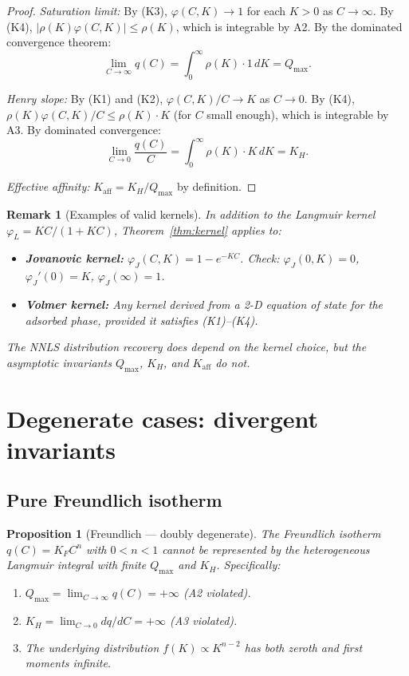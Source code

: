 \documentclass[12pt]{article}
\newtheorem{proposition}{Proposition}
\newtheorem{remark}{Remark}
\begin{document}
\begin{proof}
\textit{Saturation limit:}
By (K3), $\varphi(C,K)\to 1$ for each $K>0$ as $C\to\infty$.
By (K4), $|\rho(K)\varphi(C,K)|\le\rho(K)$, which is integrable by
A2.  By the dominated convergence theorem:
\[
  \lim_{C\to\infty}q(C) = \int_0^\infty \rho(K)\cdot 1\,dK
  = Q_{\max}.
\]

\textit{Henry slope:}
By (K1) and (K2), $\varphi(C,K)/C\to K$ as $C\to 0$.
By (K4), $\rho(K)\varphi(C,K)/C\le\rho(K)\cdot K$ (for $C$
small enough), which is integrable by A3.  By dominated convergence:
\[
  \lim_{C\to 0}\frac{q(C)}{C}
  = \int_0^\infty \rho(K)\cdot K\,dK = K_H.
\]

\textit{Effective affinity:}
$K_{\mathrm{aff}}=K_H/Q_{\max}$ by definition.
\end{proof}

\begin{remark}[Examples of valid kernels]
In addition to the Langmuir kernel $\varphi_L=KC/(1+KC)$,
Theorem~\ref{thm:kernel} applies to:
\begin{itemize}[nosep]
  \item \textbf{Jovanovic kernel:}
        $\varphi_J(C,K)=1-e^{-KC}$.
        Check: $\varphi_J(0,K)=0$, $\varphi_J'(0)=K$,
        $\varphi_J(\infty)=1$.
  \item \textbf{Volmer kernel:}
        Any kernel derived from a 2-D equation of state for the
        adsorbed phase, provided it satisfies (K1)--(K4).
\end{itemize}
The NNLS distribution recovery \emph{does} depend on the kernel
choice, but the asymptotic invariants $Q_{\max}$, $K_H$, and
$K_{\mathrm{aff}}$ do not.
\end{remark}

\section{Degenerate cases: divergent invariants}
\label{sec:degenerate}

\subsection{Pure Freundlich isotherm}

\begin{proposition}[Freundlich --- doubly degenerate]
\label{prop:freundlich}
The Freundlich isotherm $q(C)=K_F C^{n}$ with $0<n<1$ cannot be
represented by the heterogeneous Langmuir integral with finite
$Q_{\max}$ and $K_H$.  Specifically:
\begin{enumerate}[nosep]
  \item $Q_{\max}=\lim_{C\to\infty}q(C)=+\infty$
        \quad (A2 violated).
  \item $K_H=\lim_{C\to 0}dq/dC=+\infty$
        \quad (A3 violated).
  \item The underlying distribution $f(K)\propto K^{n-2}$ has both
        zeroth and first moments infinite.
\end{enumerate}
\end{proposition}
\end{document}
